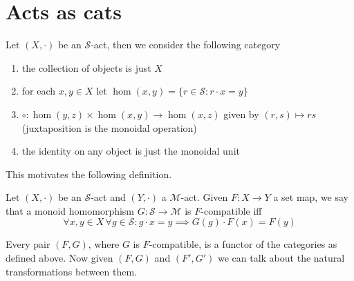 \section{Acts as cats}
\begin{definition}
    Let $(X,\cdot)$ be an $\mathcal{S}$-act, then we consider the following category
    \begin{enumerate}
        \item the collection of objects is just $X$
        \item for each $x,y\in X$ let $\hom(x,y) = \{r\in\mathcal{S} : r\cdot x = y\}$
        \item $\circ : \hom(y,z) \times \hom(x,y) \to \hom(x,z)$ given by $(r,s)\mapsto rs$ (juxtaposition is the monoidal operation)
        \item the identity on any object is just the monoidal unit
    \end{enumerate}
\end{definition}
This motivates the following definition.
\begin{definition}
    Let $(X,\cdot)$ be an $\mathcal{S}$-act and $(Y,\cdot)$ a $\mathcal{M}$-act. Given $F: X \to Y$ a set map, we say that a  
    monoid homomorphism $G: \mathcal{S}\to\mathcal{M}$ is $F$-compatible iff 
    \[
        \forall x,y\in X\,\forall g\in\mathcal{S} : g \cdot x =y \implies G(g)\cdot F(x) = F(y)
    \]
\end{definition}
Every pair $(F,G)$, where $G$ is $F$-compatible, is a functor of the categories as defined above. Now given 
$(F,G)$ and $(F',G')$ we can talk about the natural transformations between them.